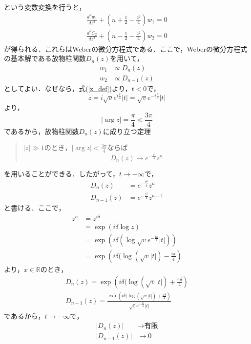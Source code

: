 という変数変換を行うと，
\begin{align}
  \frac{d^2 w_1}{d z^2} + \left(n + \frac{1}{2} - \frac{z^2}{4}\right) w_1 = 0\\
  \frac{d^2 C_2}{d z^2} + \left(n - \frac{1}{2} - \frac{z^2}{4}\right) w_2 = 0
\end{align}
が得られる．これらはWeberの微分方程式である．ここで，Weberの微分方程式の基本解である放物柱関数$D_n(z)$を用いて，
\begin{align}
  w_1 &\propto D_n(z)\\
  w_2 &\propto D_{n-1}(z)
\end{align}
としてよい．なぜなら，式(\ref{z_def})より，$t<0$で，
\begin{equation}
  z = i\sqrt{v} e^{i\frac{\pi}{4}} |t| = \sqrt{v} e^{-i\frac{\pi}{4}} |t|
\end{equation}
より，
\begin{equation}
  |\arg z| = \frac{\pi}{4} < \frac{3\pi}{4}
\end{equation}
であるから，放物柱関数$D_n(z)$に成り立つ定理
\begin{quote}
  $|z| \gg 1$のとき，$|\arg z| < \frac{3\pi}{4}$ならば
  \begin{equation}
    D_n(z) \rightarrow e^{-\frac{z^2}{4}} z^n
  \end{equation}
\end{quote}
を用いることができる．したがって，$t \rightarrow - \infty$で，
\begin{align}
  D_n(z) &= e^{-\frac{z^2}{4}} z^n\\
  D_{n-1}(z) &= e^{-\frac{z^2}{4}} z^{n-1}
\end{align}
と書ける．ここで，
\begin{align}
  z^n
  &= z^{i\delta}\\
  &= \exp(i\delta \log z)\\
  &= \exp(i\delta (\log \sqrt{v} e^{-\frac{i\pi}{4}} |t|))\\
  &= \exp \left( i\delta (\log (\sqrt{v} |t|) - \frac{i\pi}{4} \right)
\end{align}
より，$x \in \mathbb{R}$のとき，
\begin{align}
  D_n(z) = \exp \left( i\delta (\log (\sqrt{v} |t|) + \frac{\pi \delta}{4} \right) \label{D_n}\\
  D_{n-1}(z) = \frac{\exp \left( i\delta (\log (\sqrt{v} |t|) + \frac{\pi \delta}{4} \right)}{\sqrt{v} e^{-\frac{i\pi}{4}} |t|} \label{D_n-1}
\end{align}
であるから，$t \rightarrow -\infty$で，
\begin{align}
  |D_n(z)| &\rightarrow \text{有限}\\
  |D_{n-1}(z)| &\rightarrow 0
\end{align}
